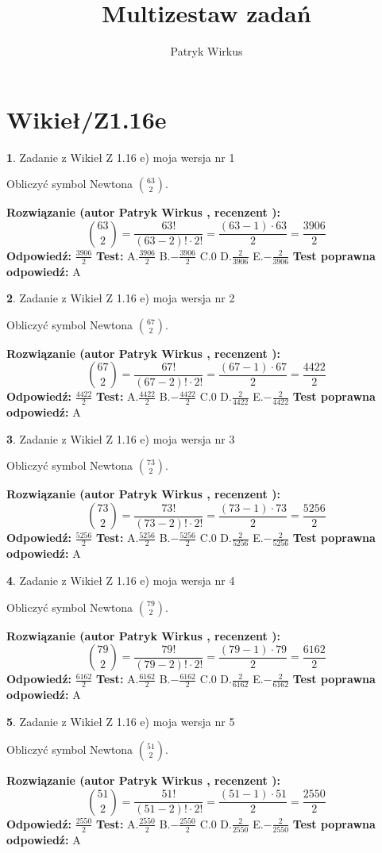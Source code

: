 \documentclass[12pt, a4paper]{article}
\title{Multizestaw zadań}
\author{Patryk Wirkus}
\date{}
\theoremstyle{definition} %
\newtheorem{zad}{}
\newcommand{\kategoria}[1]{\section{#1}}
\newcommand{\zadStart}[1]{\begin{zad}#1\newline}
\newcommand{\zadStop}{\end{zad}}
\newcommand{\rozwStart}[2]{\noindent \textbf{Rozwiązanie (autor #1 , recenzent #2): }\newline}
\newcommand{\rozwStop}{\newline}
\newcommand{\odpStart}{\noindent \textbf{Odpowiedź:}\newline}
\newcommand{\odpStop}{\newline}
\newcommand{\testStart}{\noindent \textbf{Test:}\newline}
\newcommand{\testStop}{\newline}
\newcommand{\kluczStart}{\noindent \textbf{Test poprawna odpowiedź:}\newline}
\newcommand{\kluczStop}{\newline}
\begin{document}
\maketitle

\kategoria{Wikieł/Z1.16e}


\zadStart{Zadanie z Wikieł Z 1.16 e) moja wersja nr 1}

Obliczyć symbol Newtona ${63 \choose 2}$.
\zadStop
\rozwStart{Patryk Wirkus}{}
$${63 \choose 2} = \frac{63!}{(63-2)! \cdot 2!} = \frac{(63-1) \cdot 63}{2} = \frac{3906}{2}$$
\rozwStop
\odpStart
$\frac{3906}{2}$
\odpStop
\testStart
A.$\frac{3906}{2}$ B.$-\frac{3906}{2}$ C.$0$ D.$\frac{2}{3906}$ E.$-\frac{2}{3906}$
\testStop
\kluczStart
A
\kluczStop



\zadStart{Zadanie z Wikieł Z 1.16 e) moja wersja nr 2}

Obliczyć symbol Newtona ${67 \choose 2}$.
\zadStop
\rozwStart{Patryk Wirkus}{}
$${67 \choose 2} = \frac{67!}{(67-2)! \cdot 2!} = \frac{(67-1) \cdot 67}{2} = \frac{4422}{2}$$
\rozwStop
\odpStart
$\frac{4422}{2}$
\odpStop
\testStart
A.$\frac{4422}{2}$ B.$-\frac{4422}{2}$ C.$0$ D.$\frac{2}{4422}$ E.$-\frac{2}{4422}$
\testStop
\kluczStart
A
\kluczStop



\zadStart{Zadanie z Wikieł Z 1.16 e) moja wersja nr 3}

Obliczyć symbol Newtona ${73 \choose 2}$.
\zadStop
\rozwStart{Patryk Wirkus}{}
$${73 \choose 2} = \frac{73!}{(73-2)! \cdot 2!} = \frac{(73-1) \cdot 73}{2} = \frac{5256}{2}$$
\rozwStop
\odpStart
$\frac{5256}{2}$
\odpStop
\testStart
A.$\frac{5256}{2}$ B.$-\frac{5256}{2}$ C.$0$ D.$\frac{2}{5256}$ E.$-\frac{2}{5256}$
\testStop
\kluczStart
A
\kluczStop



\zadStart{Zadanie z Wikieł Z 1.16 e) moja wersja nr 4}

Obliczyć symbol Newtona ${79 \choose 2}$.
\zadStop
\rozwStart{Patryk Wirkus}{}
$${79 \choose 2} = \frac{79!}{(79-2)! \cdot 2!} = \frac{(79-1) \cdot 79}{2} = \frac{6162}{2}$$
\rozwStop
\odpStart
$\frac{6162}{2}$
\odpStop
\testStart
A.$\frac{6162}{2}$ B.$-\frac{6162}{2}$ C.$0$ D.$\frac{2}{6162}$ E.$-\frac{2}{6162}$
\testStop
\kluczStart
A
\kluczStop



\zadStart{Zadanie z Wikieł Z 1.16 e) moja wersja nr 5}

Obliczyć symbol Newtona ${51 \choose 2}$.
\zadStop
\rozwStart{Patryk Wirkus}{}
$${51 \choose 2} = \frac{51!}{(51-2)! \cdot 2!} = \frac{(51-1) \cdot 51}{2} = \frac{2550}{2}$$
\rozwStop
\odpStart
$\frac{2550}{2}$
\odpStop
\testStart
A.$\frac{2550}{2}$ B.$-\frac{2550}{2}$ C.$0$ D.$\frac{2}{2550}$ E.$-\frac{2}{2550}$
\testStop
\kluczStart
A
\kluczStop
\end{document}
